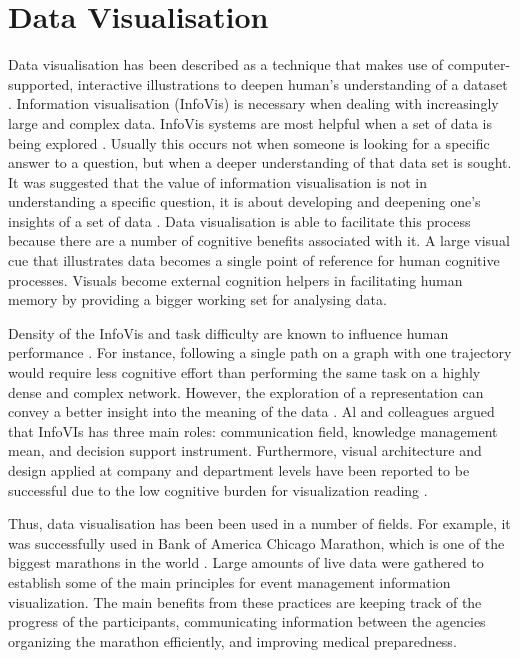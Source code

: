 \documentclass{l4proj}
\begin{document}
\section{Data Visualisation}

Data visualisation has been described as a technique that makes use of computer-supported, interactive illustrations to deepen human's understanding of a dataset \cite{card1999readings}. Information visualisation (InfoVis) is necessary when dealing with increasingly large and complex data. InfoVis systems are most helpful when a set of data is being explored \cite{fekete2008value}. Usually this occurs not when someone is looking for a specific answer to a question, but when a deeper understanding of that data set is sought. It was suggested that the value of information visualisation is not in understanding a specific question, it is about developing and deepening one's insights of a set of data \cite{fekete2008value}. Data visualisation is able to facilitate this process because there are a number of cognitive benefits associated with it. A large visual cue that illustrates data becomes a single point of reference for human cognitive processes. Visuals become external cognition helpers in facilitating human memory by providing a bigger working set for analysing data. 

Density of the InfoVis and task difficulty are known to influence human performance \cite{netzel2014comparative}. For instance, following a single path on a graph with one trajectory would require less cognitive effort than performing the same task on a highly dense and complex network. However, the exploration of a representation can convey a better insight into the meaning of the data \cite{al2014information}. Al and colleagues \cite{al2014information} argued that InfoVIs has three main roles: communication field, knowledge management mean, and decision support instrument. Furthermore, visual architecture and design applied at company and department levels have been reported to be successful due to the low cognitive burden for visualization reading \cite{king2016cognitive}.

Thus, data visualisation has been been used in a number of fields. For example, it was successfully used in Bank of America Chicago Marathon, which is one of the biggest marathons in the world \cite{hanken2016developing}. Large amounts of live data were gathered to establish some of the main principles for event management information visualization. The main benefits from these practices are keeping track of the progress of the participants, communicating information between the agencies organizing the marathon efficiently, and improving medical preparedness. 
\end{document}
